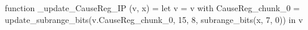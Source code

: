 function _update_CauseReg_IP (v, x) = let v = { v with CauseReg_chunk_0 = update_subrange_bits(v.CauseReg_chunk_0, 15, 8, subrange_bits(x, 7, 0)) } in
  v
